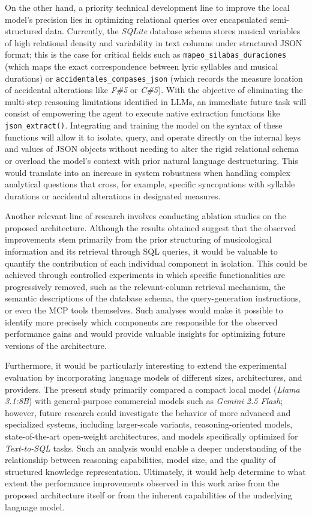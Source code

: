 On the other hand, a priority technical development line to improve the local model's precision lies in optimizing relational queries over encapsulated semi-structured data. Currently, the \textit{SQLite} database schema stores musical variables of high relational density and variability in text columns under structured JSON format; this is the case for critical fields such as \texttt{mapeo\_silabas\_duraciones} (which maps the exact correspondence between lyric syllables and musical durations) or \texttt{accidentales\_compases\_json} (which records the measure location of accidental alterations like \textit{F\#5} or \textit{C\#5}). With the objective of eliminating the multi-step reasoning limitations identified in LLMs, an immediate future task will consist of empowering the agent to execute native extraction functions like \texttt{json\_extract()}. Integrating and training the model on the syntax of these functions will allow it to isolate, query, and operate directly on the internal keys and values of JSON objects without needing to alter the rigid relational schema or overload the model's context with prior natural language destructuring. This would translate into an increase in system robustness when handling complex analytical questions that cross, for example, specific syncopations with syllable durations or accidental alterations in designated measures.

Another relevant line of research involves conducting ablation studies on the proposed architecture. Although the results obtained suggest that the observed improvements stem primarily from the prior structuring of musicological information and its retrieval through SQL queries, it would be valuable to quantify the contribution of each individual component in isolation. This could be achieved through controlled experiments in which specific functionalities are progressively removed, such as the relevant-column retrieval mechanism, the semantic descriptions of the database schema, the query-generation instructions, or even the MCP tools themselves. Such analyses would make it possible to identify more precisely which components are responsible for the observed performance gains and would provide valuable insights for optimizing future versions of the architecture.

Furthermore, it would be particularly interesting to extend the experimental evaluation by incorporating language models of different sizes, architectures, and providers. The present study primarily compared a compact local model (\textit{Llama 3.1:8B}) with general-purpose commercial models such as \textit{Gemini 2.5 Flash}; however, future research could investigate the behavior of more advanced and specialized systems, including larger-scale variants, reasoning-oriented models, state-of-the-art open-weight architectures, and models specifically optimized for \textit{Text-to-SQL} tasks. Such an analysis would enable a deeper understanding of the relationship between reasoning capabilities, model size, and the quality of structured knowledge representation. Ultimately, it would help determine to what extent the performance improvements observed in this work arise from the proposed architecture itself or from the inherent capabilities of the underlying language model.

